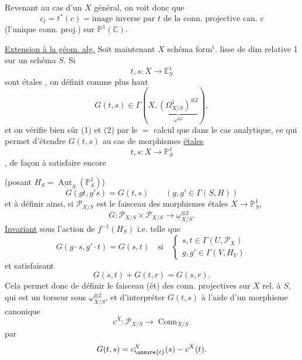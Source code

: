 Revenant au cas d'un $X$ général, on voit donc que
\[
c_t=t^*(c)=\text{image inverse par }t\text{ de la conn. projective can. }c
\]
(l'unique conn. proj.) sur $\mathbb P^1(\mathbb C)$.

\uline{Extension à la géom. alg.} Soit maintenant $X$ schéma form$^{\mathrm t}$. lisse de dim  relative 1 sur un schéma $S$. Si 
\[
t,s:X\longrightarrow\mathbb E^1_S
\]
sont étales , on définit comme plus haut
\[
G(t,s)\in\Gamma(X,\underbrace{(\Omega^1_{X/S})^{\otimes2}}_{\underline\omega^{\otimes2}}),
\]
et on vérifie bien sûr (1) et (2) par le $=$ calcul que dans le cas analytique, ce qui permet d'étendre $G(t,s)$ au cas de morphismes \uline{étales}
\[
t,s:X\longrightarrow\mathbb P^1_S
\]
, de façon à satisfaire encore 

(posant $H_S=\underline{\operatorname{Aut}}_S(\mathbb P^1_S)$)
\[
G(gt,g's)=G(t,s)\qquad(g,g'\in\Gamma(S,H))
\]
et à définir ainsi, si $\mathcal P_{X/S}$ est le faisceau  des morphismes étales $X\longrightarrow\mathbb P^1_S$,  
\[
G:\mathcal P_{X/S}\times\mathcal P_{X/S}\longrightarrow\underline\omega_{X/S}^{\otimes2}.
\]
\uline{Invariant} sous l'action de $f^{-1}(H_S)$ i.e. telle que
\[
G(g\cdot s,g'\cdot t)=G(s,t)\quad\text{si}\quad
\left\{\begin{array}{l}s,t\in\Gamma(U,\mathcal P_X)\\g,g'\in\Gamma(V,H_V)\end{array}\right.
\]
et satisfaisant
\[
G(s,t)+G(t,r)=G(s,r).
\]
Cela permet donc de définir le faisceau  (ét) des conn. projectives sur $X$ rel. à $S$, qui est un torseur sous $\underline\omega_{X/S}^{\otimes2}$, et d'interpréter $G(t,s)$ à l'aide d'un morphisme canonique
\[
c^X:\mathcal P_{X/S}\longrightarrow\operatorname{Conn}_{X/S}
\]
par
\[
G(t,s)=c^X_{\unsure{t}}(s)-c^X(t).
\]

